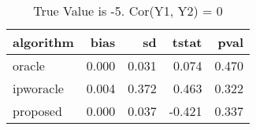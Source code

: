 \begin{table}[h!]
\caption{True Value is -5. Cor(Y1, Y2) = 0}
\centering
\begin{tabular}[t]{lrrrr}
\toprule
algorithm & bias & sd & tstat & pval\\
\midrule
oracle & 0.000 & 0.031 & 0.074 & 0.470\\
ipworacle & 0.004 & 0.372 & 0.463 & 0.322\\
proposed & 0.000 & 0.037 & -0.421 & 0.337\\
\bottomrule
\end{tabular}
\end{table}
